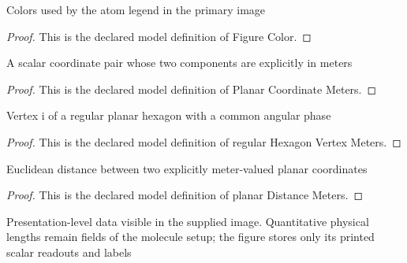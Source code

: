 \begin{definition}
  \label{def:physics:phyx-mini-0538:phyxminiproblems-problemphyxmini0538-figurecolor}
  Colors used by the atom legend in the primary image
\end{definition}
\begin{proof}
  This is the declared model definition of Figure Color.
\end{proof}
\begin{definition}
  \label{def:physics:phyx-mini-0538:phyxminiproblems-problemphyxmini0538-planarcoordinatemeters}
  A scalar coordinate pair whose two components are explicitly in meters
\end{definition}
\begin{proof}
  This is the declared model definition of Planar Coordinate Meters.
\end{proof}
\begin{definition}
  \label{def:physics:phyx-mini-0538:phyxminiproblems-problemphyxmini0538-regularhexagonvertexmeters}
  Vertex i of a regular planar hexagon with a common angular phase
\end{definition}
\begin{proof}
  This is the declared model definition of regular Hexagon Vertex Meters.
\end{proof}
\begin{definition}
  \label{def:physics:phyx-mini-0538:phyxminiproblems-problemphyxmini0538-planardistancemeters}
  Euclidean distance between two explicitly meter-valued planar coordinates
\end{definition}
\begin{proof}
  This is the declared model definition of planar Distance Meters.
\end{proof}
\begin{definition}
  \label{def:physics:phyx-mini-0538:phyxminiproblems-problemphyxmini0538-benzenefigure}
  Presentation-level data visible in the supplied image. Quantitative physical lengths remain fields of the molecule setup; the figure stores only its printed scalar readouts and labels
\end{definition}
